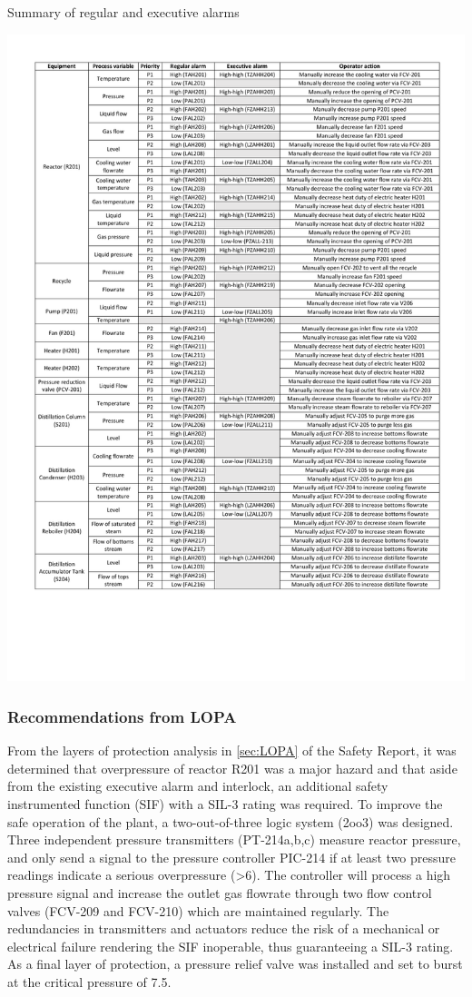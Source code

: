 \begin{table}[H]
  \caption{Summary of regular and executive alarms}
\includegraphics[clip, trim=1cm 4cm 1cm 1cm,  width=\linewidth]{chapters/4-operation-control/4-Figures/Alarms.pdf}
\label{tab:alarms}
\end{table}

\subsubsection{Recommendations from LOPA} %
From the layers of protection analysis in \cref{sec:LOPA} of the Safety Report, it was determined that overpressure of reactor R201 was a major hazard and that aside from the existing executive alarm and interlock, an additional safety instrumented function (SIF) with a SIL-3 rating was required. To improve the safe operation of the plant, a two-out-of-three logic system (2oo3) was designed. Three independent pressure transmitters (PT-214a,b,c) measure reactor pressure, and only send a signal to the pressure controller PIC-214 if at least two pressure readings indicate a serious overpressure (\SI{>6}{\atm}). The controller will process a high pressure signal and increase the outlet gas flowrate through two flow control valves (FCV-209 and FCV-210) which are maintained regularly. The redundancies in transmitters and actuators reduce the risk of a mechanical or electrical failure rendering the SIF inoperable, thus guaranteeing a SIL-3 rating. As a final layer of protection, a pressure relief valve was installed and set to burst at the critical pressure of \SI{7.5}{\atm}.

